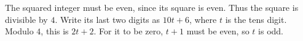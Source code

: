 The squared integer must be even, since its square is even. Thus the square is divisible by $4$. Write its last two digits as $10t+6$, where $t$ is the tens digit. Modulo $4$, this is $2t+2$. For it to be zero, $t+1$ must be even, so $t$ is odd.
